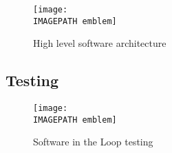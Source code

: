 \begin{figure}[!ht]
	\centering
	\texttt{[image: \\IMAGEPATH emblem]}
	\caption{High level software architecture}
	\label{fig:softwarearchitecture}
\end{figure}

\subsection{Testing}

\begin{figure}[!ht]
	\centering
	\texttt{[image: \\IMAGEPATH emblem]}
	\caption{Software in the Loop testing}
	\label{fig:sitl}
\end{figure}
